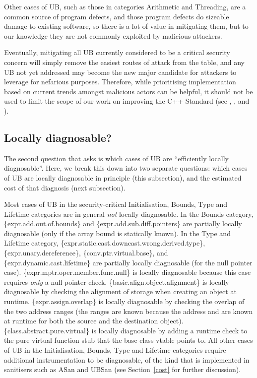 Other cases of UB, such as those in categories Arithmetic and Threading, are a common source of program defects, and those program defects do sizeable damage to existing software, so there is a lot of value in mitigating them, but to our knowledge they are not commonly exploited by malicious attackers.

Eventually, mitigating all UB currently considered to be a critical security concern will simply remove the easiest routes of attack from the table, and any UB not yet addressed may become the new major candidate for attackers to leverage for nefarious purposes.  Therefore, while prioritising implementation based on current trends amongst malicious actors can be helpful, it should not be used to limit the scope of our work on improving the C++ Standard (see \cite{Sutter2024}, \cite{P3500R1}, and \cite{P3578R0}).

\subsection{Locally diagnosable?}
\label{locally}

The second question that \cite{P3656R1} asks is which cases of UB are ``efficiently locally diagnosable''. Here, we break this down into two separate questions: which cases of UB are locally diagnosable in principle (this subsection), and the estimated cost of that diagnosis (next subsection).

Most cases of UB in the security-critical Initialisation, Bounds, Type and Lifetime categories are in general \emph{not} locally diagnosable.  In the Bounds category, 
\{expr.add.out.of.bounds\} 
and \{expr.add.sub.diff.pointers\} 
are partially locally diagnosable (only if the array bound is statically known). In the Type and Lifetime category,
\{expr.static.cast.downcast.wrong.derived.type\},
\{expr.unary.dereference\}, 
\{conv.ptr.virtual.base\}, and
\{expr.dynamic.cast.lifetime\}
are partially locally diagnosable (for the null pointer case).
\{expr.mptr.oper.member.func.null\} is locally diagnosable because this case requires \emph{only} a null pointer check.
\{basic.align.object.alignment\} is locally diagnosable by checking the alignment of storage when creating an object at runtime.
\{expr.assign.overlap\} is locally diagnosable by checking the overlap of the two address ranges (the ranges are known because the address and  are known at runtime for both the source and the destination object). \{class.abstract.pure.virtual\} is locally diagnosable by adding a runtime check to  the pure virtual function stub that the base class vtable points to. All other cases of UB in the Initialisation, Bounds, Type and Lifetime categories require additional instrumentation to be diagnosable, of the kind that is implemented in sanitisers such as ASan and UBSan (see Section~\ref{cost} for further discussion).

